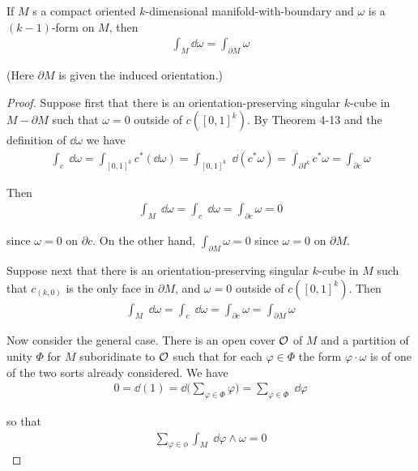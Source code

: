 \begin{theorem}
    If $M$ s a compact oriented $k$-dimensional manifold-with-boundary and $\omega$ is a
    $(k-1)$-form on $M$, then
    \begin{align*}
        \int_M\dd\omega = \int_{\partial M}\omega
    \end{align*}
\end{theorem}

(Here $\partial M$ is given the induced orientation.)


\begin{proof}
    Suppose first that there is an orientation-preserving singular $k$-cube in $M-\partial M$ such that 
    $\omega=0$ outside of $c([0,1]^k)$. By Theorem 4-13 and the definition of $\dd\omega$ we have 
    \begin{align*}
        \int_{c}\;\dd\omega
        = \int_{[0,1]^k}c^*(\dd\omega)
        = \int_{[0,1]^k}\;\dd(c^*\omega)
        = \int_{\partial I^k}c^*\omega
        = \int_{\partial c}\omega       
    \end{align*} 

    Then 
    \begin{align*}
        \int_M\;\dd\omega
        = \int_c\;\dd\omega
        = \int_{\partial c}\omega
        = 0        
    \end{align*}

    since $\omega=0$ on $\partial c$. On the other hand, $\int_{\partial M}\omega =0$ since 
    $\omega=0$ on $\partial M$.

    Suppose next that there is an orientation-preserving singular $k$-cube in $M$ such that 
    $c_{(k,0)}$ is the only face in $\partial M$, and $\omega=0$ outside of $c([0,1]^k)$. Then
    \begin{align*}
        \int_{{M}}\;\dd\omega
        = \int_{{c}}\;\dd\omega
        = \int_{{\partial c}}\omega
        = \int_{{\partial M}}\omega        
    \end{align*}

    Now consider the general case. There is an open cover $\mathcal{O}$ of $M$ and a partition of unity
    $\Phi$ for $M$ suboridinate to $\mathcal{O}$ such that for each $\varphi\in\Phi$ the form $\varphi\cdot\omega$
    is of one of the two sorts already considered. We have 
    \begin{align*}
        0 = \dd(1) = \dd\bigg(\sum_{\varphi\in\Phi}\varphi\bigg)
        = \sum_{\varphi\in\Phi}\;\dd\varphi
    \end{align*}

    so that 
    \begin{align*}
        \sum_{\varphi\in\phi}^{}{\int_M \;\dd\varphi\wedge\omega} = 0
    \end{align*}


\end{proof}
